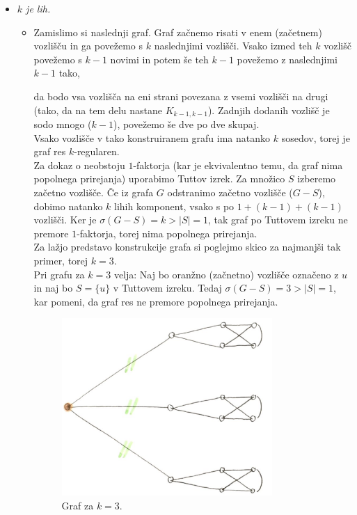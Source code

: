 \documentclass[a4paper,11pt]{article}
\begin{document}
\begin{itemize}
\begin{itemize}[label={}]
    \end{itemize}

\item \textit{$k$ je lih.}
    \begin{itemize}[label={}]
        \item Zamislimo si naslednji graf. Graf začnemo risati v enem (začetnem) vozlišču in ga povežemo s $k$ naslednjimi vozlišči. Vsako izmed teh $k$ vozlišč povežemo s $k - 1$ novimi in potem še teh $k - 1$ povežemo z naslednjimi $k - 1$ tako, 
        
                da bodo vsa vozlišča na eni strani povezana z vsemi vozlišči na drugi (tako, da na tem delu nastane $K_{k-1, k-1}$). 
                Zadnjih dodanih vozlišč je sodo mnogo ($k - 1$), povežemo še dve po dve skupaj.
                \\
                Vsako vozlišče v tako konstruiranem grafu ima natanko $k$ sosedov, torej je graf res $k$-regularen.
                \\
                Za dokaz o neobstoju $1$-faktorja (kar je ekvivalentno temu, da graf nima popolnega prirejanja) uporabimo Tuttov izrek. Za množico $S$ izberemo začetno vozlišče. Če iz grafa $G$ odstranimo začetno vozlišče ($G - S$), dobimo natanko $k$ lihih komponent, vsako s po $1 + (k - 1) + (k - 1)$ vozlišči. Ker je $\sigma (G - S) = k > |S| = 1$, tak graf po Tuttovem izreku ne premore $1$-faktorja, torej nima popolnega prirejanja.
                \\
                Za lažjo predstavo konstrukcije grafa si poglejmo skico za najmanjši tak primer, torej $k = 3$.
                \\
                Pri grafu za $k = 3$ velja: Naj bo oranžno (začnetno) vozlišče označeno z $u$ in naj bo $S = \{ u\}$ v Tuttovem izreku. 
                Tedaj $\sigma(G - S) = 3 > |S| = 1$, kar pomeni, da graf res ne premore popolnega prirejanja.
                \begin{figure}[ht!]
                    \centering
                    \includegraphics[width=80mm]{Slike/k_lih.png}
                    \caption{Graf za $k = 3$.}
                \end{figure}
    \end{itemize}
\end{itemize}
\end{document}
